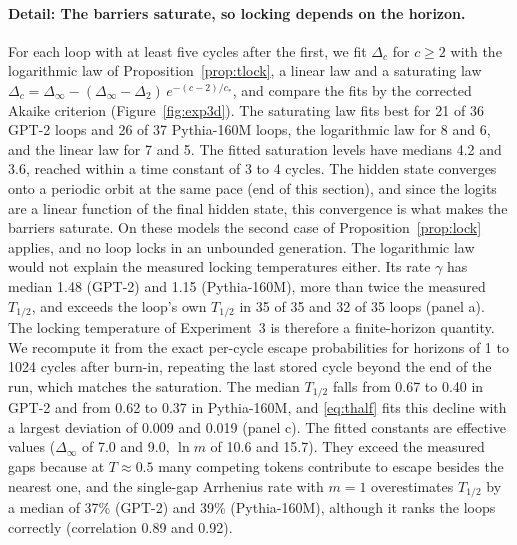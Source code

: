 \paragraph{Detail: The barriers saturate, so locking depends on the horizon.} For each loop with at least five cycles after the first, we fit $\Delta_c$ for $c\ge2$ with the logarithmic law of Proposition~\ref{prop:tlock}, a linear law and a saturating law $\Delta_c=\Delta_\infty-(\Delta_\infty-\Delta_2)\,e^{-(c-2)/c_\ast}$, and compare the fits by the corrected Akaike criterion (Figure~\ref{fig:exp3d}). The saturating law fits best for 21 of 36 GPT-2 loops and 26 of 37 Pythia-160M loops, the logarithmic law for 8 and 6, and the linear law for 7 and 5. The fitted saturation levels have medians 4.2 and 3.6, reached within a time constant of 3 to 4 cycles. The hidden state converges onto a periodic orbit at the same pace (end of this section), and since the logits are a linear function of the final hidden state, this convergence is what makes the barriers saturate. On these models the second case of Proposition~\ref{prop:lock} applies, and no loop locks in an unbounded generation. The logarithmic law would not explain the measured locking temperatures either. Its rate $\gamma$ has median 1.48 (GPT-2) and 1.15 (Pythia-160M), more than twice the measured $T_{1/2}$, and exceeds the loop's own $T_{1/2}$ in 35 of 35 and 32 of 35 loops (panel a). The locking temperature of Experiment~3 is therefore a finite-horizon quantity. We recompute it from the exact per-cycle escape probabilities for horizons of 1 to 1024 cycles after burn-in, repeating the last stored cycle beyond the end of the run, which matches the saturation. The median $T_{1/2}$ falls from 0.67 to 0.40 in GPT-2 and from 0.62 to 0.37 in Pythia-160M, and \eqref{eq:thalf} fits this decline with a largest deviation of 0.009 and 0.019 (panel c). The fitted constants are effective values ($\Delta_\infty$ of 7.0 and 9.0, $\ln m$ of 10.6 and 15.7). They exceed the measured gaps because at $T\approx0.5$ many competing tokens contribute to escape besides the nearest one, and the single-gap Arrhenius rate with $m=1$ overestimates $T_{1/2}$ by a median of 37\% (GPT-2) and 39\% (Pythia-160M), although it ranks the loops correctly (correlation 0.89 and 0.92).

